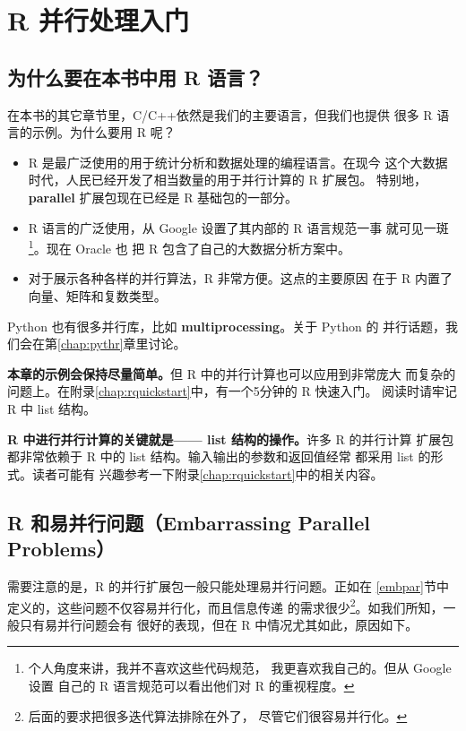 \chapter{R 并行处理入门}
\label{chap:r}

\section{为什么要在本书中用 R 语言？}

在本书的其它章节里，C/C++依然是我们的主要语言，但我们也提供
很多 R 语言的示例。为什么要用 R 呢？

\begin{itemize}

\item R 是最广泛使用的用于统计分析和数据处理的编程语言。在现今
这个大数据时代，人民已经开发了相当数量的用于并行计算的 R 扩展包。
特别地，{\bf parallel} 扩展包现在已经是 R 基础包的一部分。

\item R 语言的广泛使用，从 Google 设置了其内部的 R 语言规范一事
就可见一斑\footnote{个人角度来讲，我并不喜欢这些代码规范，
我更喜欢我自己的。但从 Google 设置
自己的 R 语言规范可以看出他们对 R 的重视程度。}。现在 Oracle 也
把 R 包含了自己的大数据分析方案中。

\item 对于展示各种各样的并行算法，R 非常方便。这点的主要原因
在于 R 内置了向量、矩阵和复数类型。

\end{itemize}

Python 也有很多并行库，比如 {\bf multiprocessing}。关于 Python 的
并行话题，我们会在第\ref{chap:pythr}章里讨论。

{\bf 本章的示例会保持尽量简单。}但 R 中的并行计算也可以应用到非常庞大
而复杂的问题上。在附录\ref{chap:rquickstart}中，有一个5分钟的 R 快速入门。
阅读时请牢记 R 中 list 结构。

{\bf R 中进行并行计算的关键就是—— list 结构的操作。}许多 R 的并行计算
扩展包都非常依赖于 R 中的 list 结构。输入输出的参数和返回值经常
都采用 list 的形式。读者可能有
兴趣参考一下附录\ref{chap:rquickstart}中的相关内容。

\section{R 和易并行问题（Embarrassing Parallel Problems）}

需要注意的是，R 的并行扩展包一般只能处理易并行问题。正如在
\ref{embpar}节中定义的，这些问题不仅容易并行化，而且信息传递
的需求很少\footnote{后面的要求把很多迭代算法排除在外了，
尽管它们很容易并行化。}。如我们所知，一般只有易并行问题会有
很好的表现，但在 R 中情况尤其如此，原因如下。

